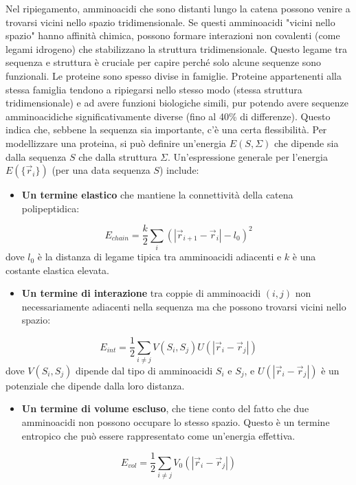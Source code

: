 Nel ripiegamento, amminoacidi che sono distanti lungo la catena possono venire a trovarsi vicini nello spazio tridimensionale. Se questi amminoacidi "vicini nello spazio" hanno affinità chimica, possono formare interazioni non covalenti (come legami idrogeno) che stabilizzano la struttura tridimensionale. Questo legame tra sequenza e struttura è cruciale per capire perché solo alcune sequenze sono funzionali.
Le proteine sono spesso divise in famiglie. Proteine appartenenti alla stessa famiglia tendono a ripiegarsi nello stesso modo (stessa struttura tridimensionale) e ad avere funzioni biologiche simili, pur potendo avere sequenze amminoacidiche significativamente diverse (fino al 40\% di differenze). Questo indica che, sebbene la sequenza sia importante, c'è una certa flessibilità.
Per modellizzare una proteina, si può definire un'energia $E(S, \Sigma)$ che dipende sia dalla sequenza $S$ che dalla struttura $\Sigma$. Un'espressione generale per l'energia $E(\{\vec{r}_i\})$ (per una data sequenza $S$) include:

\begin{itemize}
    \item \textbf{Un termine elastico} che mantiene la connettività della catena polipeptidica:
\end{itemize}
\begin{equation} \label{eq:ch23_15}
E_{chain} = \frac{k}{2} \sum_i (\left|\vec{r}_{i+1} - \vec{r}_i\right| - l_0)^2
\end{equation}
dove $l_0$ è la distanza di legame tipica tra amminoacidi adiacenti e $k$ è una costante elastica elevata.

\begin{itemize}
    \item \textbf{Un termine di interazione} tra coppie di amminoacidi $(i,j)$ non necessariamente adiacenti nella sequenza ma che possono trovarsi vicini nello spazio:
\end{itemize}
\begin{equation} \label{eq:ch23_16}
E_{int} = \frac{1}{2} \sum_{i \neq j} V(S_i, S_j) U(\left|\vec{r}_i - \vec{r}_j\right|)
\end{equation}
dove $V(S_i, S_j)$ dipende dal tipo di amminoacidi $S_i$ e $S_j$, e $U(\left|\vec{r}_i - \vec{r}_j\right|)$ è un potenziale che dipende dalla loro distanza.

\begin{itemize}
    \item \textbf{Un termine di volume escluso}, che tiene conto del fatto che due amminoacidi non possono occupare lo stesso spazio. Questo è un termine entropico che può essere rappresentato come un'energia effettiva.
\end{itemize}
\begin{equation} \label{eq:ch23_17}
E_{vol} = \frac{1}{2} \sum_{i \neq j} V_0(\left|\vec{r}_i - \vec{r}_j\right|)
\end{equation}

